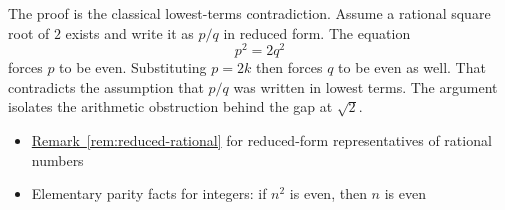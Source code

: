\begin{remark*}
The proof is the classical lowest-terms contradiction. Assume a rational square
root of $2$ exists and write it as $p/q$ in reduced form. The equation
\[
p^2=2q^2
\]
forces $p$ to be even. Substituting $p=2k$ then forces $q$ to be even as well.
That contradicts the assumption that $p/q$ was written in lowest terms. The
argument isolates the arithmetic obstruction behind the gap at $\sqrt{2}$.
\end{remark*}

\begin{dependencies}
\begin{itemize}
  \item \hyperref[rem:reduced-rational]{Remark~\ref*{rem:reduced-rational}} for reduced-form representatives of rational numbers
  \item Elementary parity facts for integers: if $n^2$ is even, then $n$ is even
\end{itemize}
\end{dependencies}


\clearpage
